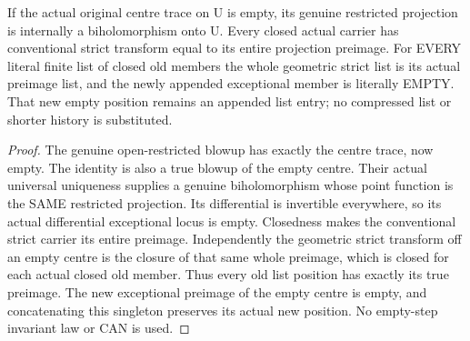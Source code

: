 \begin{theorem}
\label{hir:sharp-original-first-blowup-silent-open-dictionary}
\leanok
If the actual original centre trace on U is empty, its genuine restricted
projection is internally a biholomorphism onto U. Every closed actual
carrier has conventional strict transform equal to its entire projection
preimage. For EVERY literal finite list of closed old members the whole
geometric strict list is its actual preimage list, and the newly appended
exceptional member is literally EMPTY. That new empty position remains
an appended list entry; no compressed list or shorter history is substituted.
\end{theorem}
\begin{proof}
The genuine open-restricted blowup has exactly the centre trace, now empty.
The identity is also a true blowup of the empty centre. Their actual universal
uniqueness supplies a genuine biholomorphism whose point function is the
SAME restricted projection. Its differential is invertible everywhere, so
its actual differential exceptional locus is empty. Closedness makes the
conventional strict carrier its entire preimage. Independently the geometric
strict transform off an empty centre is the closure of that same whole
preimage, which is closed for each actual closed old member. Thus every old
list position has exactly its true preimage. The new exceptional preimage
of the empty centre is empty, and concatenating this singleton preserves
its actual new position. No empty-step invariant law or CAN is used.
\end{proof}

